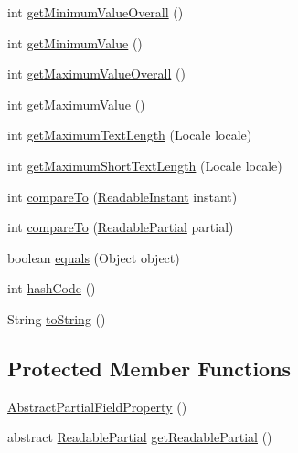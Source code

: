 \begin{DoxyCompactItemize}
\item 
int \hyperlink{classorg_1_1joda_1_1time_1_1field_1_1_abstract_partial_field_property_a99da481f1bb166d0ca2b6d0178cb73b9}{get\-Minimum\-Value\-Overall} ()
\item 
int \hyperlink{classorg_1_1joda_1_1time_1_1field_1_1_abstract_partial_field_property_abc26b5c3c2b6c21ce165f04186a41dfb}{get\-Minimum\-Value} ()
\item 
int \hyperlink{classorg_1_1joda_1_1time_1_1field_1_1_abstract_partial_field_property_accb5acbada11f5d3203baaebb9d71a6a}{get\-Maximum\-Value\-Overall} ()
\item 
int \hyperlink{classorg_1_1joda_1_1time_1_1field_1_1_abstract_partial_field_property_a646e50adaaec8058c373517fcac148b9}{get\-Maximum\-Value} ()
\item 
int \hyperlink{classorg_1_1joda_1_1time_1_1field_1_1_abstract_partial_field_property_abb55f1ed3369a6e0f494f7a145526b28}{get\-Maximum\-Text\-Length} (Locale locale)
\item 
int \hyperlink{classorg_1_1joda_1_1time_1_1field_1_1_abstract_partial_field_property_ad9e2049546b50044701a22f73dac7084}{get\-Maximum\-Short\-Text\-Length} (Locale locale)
\item 
int \hyperlink{classorg_1_1joda_1_1time_1_1field_1_1_abstract_partial_field_property_a47201165d2392376ac25601f5f860d3e}{compare\-To} (\hyperlink{interfaceorg_1_1joda_1_1time_1_1_readable_instant}{Readable\-Instant} instant)
\item 
int \hyperlink{classorg_1_1joda_1_1time_1_1field_1_1_abstract_partial_field_property_a230ddc81a6d46463625cd59f72576d46}{compare\-To} (\hyperlink{interfaceorg_1_1joda_1_1time_1_1_readable_partial}{Readable\-Partial} partial)
\item 
boolean \hyperlink{classorg_1_1joda_1_1time_1_1field_1_1_abstract_partial_field_property_aec49a6a7c069104d1b600cc17bb6d077}{equals} (Object object)
\item 
int \hyperlink{classorg_1_1joda_1_1time_1_1field_1_1_abstract_partial_field_property_ae29829d113d2888faae1d1a5ebfb9dbd}{hash\-Code} ()
\item 
String \hyperlink{classorg_1_1joda_1_1time_1_1field_1_1_abstract_partial_field_property_a6abb9d1657ff4e2ee845f43c4f351f17}{to\-String} ()
\end{DoxyCompactItemize}
\subsection*{Protected Member Functions}
\begin{DoxyCompactItemize}
\item 
\hyperlink{classorg_1_1joda_1_1time_1_1field_1_1_abstract_partial_field_property_a1fbda0d5bd90de8db104f8cba90273c3}{Abstract\-Partial\-Field\-Property} ()
\item 
abstract \hyperlink{interfaceorg_1_1joda_1_1time_1_1_readable_partial}{Readable\-Partial} \hyperlink{classorg_1_1joda_1_1time_1_1field_1_1_abstract_partial_field_property_a4e9909ce50ac6cc500f4bede5c0bd2af}{get\-Readable\-Partial} ()
\end{DoxyCompactItemize}


